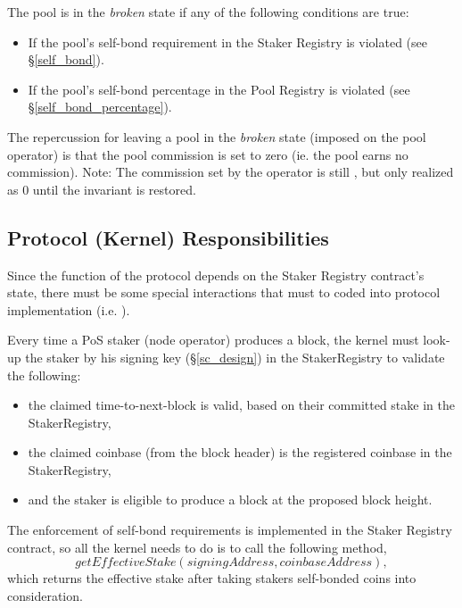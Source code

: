 The pool is in the \textit{broken} state if any of the following conditions are true: 
\begin{itemize}
    \item If the pool's self-bond requirement in the Staker Registry is violated (see \S\ref{self_bond}).
    \item If the pool's self-bond percentage in the Pool Registry is violated (see \S\ref{self_bond_percentage}).
\end{itemize}

The repercussion for leaving a pool in the \textit{broken} state (imposed on the pool operator) is that the pool commission is set to zero (ie. the pool earns no commission). Note: The commission set by the operator is still , but only realized as 0 until the invariant is restored.

\subsection{Protocol (Kernel) Responsibilities}
Since the function of the protocol depends on the Staker Registry contract's state, there must be some special interactions that must to coded into protocol implementation (i.e. ). 

Every time a PoS staker (node operator) produces a block, the kernel must look-up the staker by his signing key (\S\ref{sc_design}) in the StakerRegistry to validate the following:
\begin{itemize}[label=--,nosep]
    \item the claimed time-to-next-block is valid, based on their committed stake in the StakerRegistry,
    \item the claimed coinbase (from the block header) is the registered coinbase in the StakerRegistry,
    \item and the staker is eligible to produce a block at the proposed block height. 
\end{itemize}

The enforcement of self-bond requirements is implemented in the Staker Registry contract, so all the kernel needs to do is to call the following method, $$getEffectiveStake(signingAddress, coinbaseAddress),$$
which returns the effective stake after taking stakers self-bonded coins into consideration.

